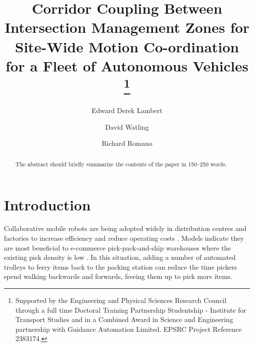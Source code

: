 \documentclass[runningheads]{llncs}
\begin{document}
%
\title{Corridor Coupling Between Intersection Management Zones for Site-Wide Motion Co-ordination for a Fleet of Autonomous Vehicles  
\thanks{Supported by the Engineering and Physical Sciences Research Council  through a full time Doctoral Training Partnership Studentship - Institute for Transport Studies and in a Combined Award in Science and Engineering partnership with Guidance Automation Limited. 
EPSRC Project Reference 2383174. }}
%
%
\author{Edward Derek Lambert \and
David Watling   \and
Richard Romano}
%
%
%
\maketitle              %
%
\begin{abstract}
The abstract should briefly summarize the contents of the paper in
150--250 words.

\end{abstract}
%
%
%
%
%
\section{Introduction}

Collaborative mobile robots are being adopted widely in distribution centres and factories to increase efficiency and reduce operating costs \cite{Azadeh2019}. Models indicate they are most beneficial to e-commerce pick-pack-and-ship warehouses where the existing pick density is low \cite{Meller2018}. In this situation, adding a number of automated trolleys to ferry items back to the packing station can reduce the time pickers spend walking backwards and forwards, freeing them up to pick more items.
\end{document}
